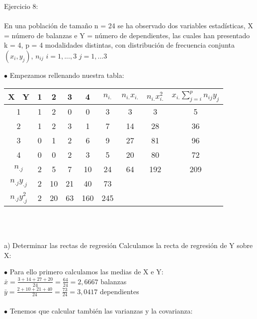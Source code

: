 \documentclass{article}
\begin{document}
	Ejercicio 8: \\ \\
	
	En una población de tamaño n = 24 se ha observado dos variables estadísticas,
	X = número de balanzas e Y = número de dependientes, las cuales han
	presentado k = 4, p = 4 modalidades distintas, con distribución de frecuencia
	conjunta $(x_{i},y_{j})$, $n_{ij}$ $ i = 1,...,3$ $ j=1,...3$
	
	$\bullet$ Empezamos rellenando nuestra tabla: \\
	
	\begin{tabular}{ | c | c | c | c | c | c | c | c| c| }
		
		
		\hline	
		X \ Y & 1 & 2 & 3 & 4  & $n_{i.}$ & $n_{i.}x_{i.}$ &  $n_{i.}x_{i.}^{2}$ & $x_{i.}\sum_{j=i}^{p}n_{ij}y_{j}$ \\ \hline
		1 & 1 & 2  & 0 & 0 & 3 & 3 & 3 & 5 \\
		2 & 1 & 2 & 3 & 1& 7 & 14 & 28 & 36 \\
		3 & 0 & 1 & 2 & 6 & 9 & 27 & 81 & 96 \\
		4& 0 & 0  & 2  & 3 & 5 & 20 & 80  & 72 \\
		$n_{.j}$& 2 & 5  & 7 & 10 & 24 & 64 & 192 & 209 \\ 
		$n_{.j}y_{.j}$ & 2 & 10 & 21 & 40 & 73 & & &  \\
		$n_{.j}y_{.j}^{2}$& 2 & 20 & 63 & 160 & 245 & & & \\\hline
		
		
	\end{tabular}
	\\ \\
	
		\begin{flushleft}
			a) Determinar las rectas de regresión
	Calculamos la recta de regresión de Y sobre X:
		\end{flushleft}
	$\bullet$ Para ello primero calculamos las medias de X e Y: \\
	
	$\bar{x} = \frac{3 + 14 + 27 +20}{24} = \frac{64}{24} = 2,6667 $ balanzas
	\\ 
	
	$\bar{y} = \frac{2 + 10+21 +40}{24} = \frac{73}{24} = 3,0417  $ dependientes
	\\
	\\
	
	$\bullet$ Tenemos que calcular también las varianzas y la covarianza: \\
	
\end{document}
